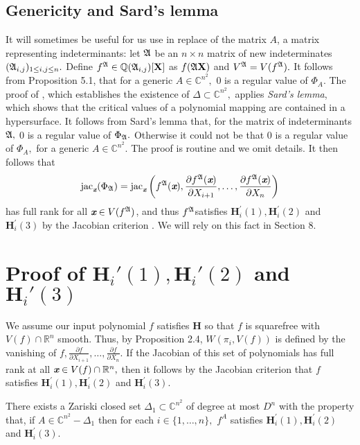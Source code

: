 \documentclass[sigconf]{acmart}
\def\xb{\textit{\textbf{x}}}
\def\C{\mathbb{C}}
\def\jac{ \textrm{jac}}
\def\pa{\partial}
\def\A{\frak{A}}
\begin{document}
\subsection{Genericity and Sard's lemma}
%
It will sometimes be useful for us use in replace of the matrix $A$, a matrix representing indeterminants: let $\A$ be an $n \times n$ matrix of new indeterminates $(\A_{i,j})_{1 \leq i , j \leq n}.$ Define $f^{\A} \in \mathbb{Q}(\A_{i,j})[\textbf{X}]$ as $f(\A\textbf{X})$ and $V^\A=V(f^\A).$ It follows from Proposition 5.1, that for a generic $A \in \C^{n^2},$ $0$ is a regular value of $\Phi_{A}$.  The proof of \cite[Theorem B.3]{TWT}, which establishes the existence of $\Delta \subset \C^{n^2},$ applies \textit{Sard's lemma}, which shows that the critical values of a polynomial mapping are contained in a hypersurface. It follows from Sard's lemma that, for the matrix of indeterminants $\A,$ $0$ is a regular value of $\Phi_{\A}.$ Otherwise it could not be that $0$ is a regular value of $\Phi_A,$ for a generic $A\in \C^{n^2}.$ The proof is routine and we omit details. It then follows that 
\[
\jac_{\xb}(\Phi_{\A}) = \jac_{\xb}\left(f^{\A}(\xb),\frac{\pa f^{\A}(\xb)}{\pa X_{i+1}},\hdots,\frac{\pa f^{\A}(\xb)}{\pa X_n}\right)
\]
has full rank for all $\xb \in V(f^{\A})$, and thus $f^{\A}$satisfies $\textbf{H}_i^{'}(1),\textbf{H}_i^{'}(2)$ and $\textbf{H}_i^{'}(3)$ by the Jacobian criterion \cite[Theorem 16.19]{ECA}. We will rely on this fact in Section 8.
%
\section{Proof of $\textbf{H}_i'(1),\textbf{H}_i'(2)$ and $\textbf{H}_i'(3)$}
%
We assume our input polynomial $f$ satisfies \textbf{H} so that $f$ is squarefree with $V(f) \cap \mathbb{R}^n$ smooth. Thus, by Proposition 2.4,  $W(\pi_i,V(f))$ is defined by the vanishing of $f,\frac{\pa f}{\pa X_{i+1}},\hdots,\frac{\pa f}{\pa X_n}.$ If the Jacobian of this set of polynomials has full rank at all $\xb \in V(f) \cap \mathbb{R}^n,$ then it follows by the Jacobian criterion \cite[Theorem 16.19]{ECA} that $f$ satisfies $\textbf{H}_i^{'}(1),\textbf{H}_i^{'}(2)$ and $\textbf{H}_i^{'}(3)$. 
%
\begin{theorem}
There exists a Zariski closed set $\Delta_1 \subset \C^{n^2}$ of degree at most $D^n$ with the property that, if $A \in \C^{n^2} - \Delta_1$ then for each $i \in \{1,\hdots,n\},$ $f^A$ satisfies $\textbf{H}_i^{'}(1),\textbf{H}_i^{'}(2)$ and $\textbf{H}_i^{'}(3)$.
\end{theorem}
%
\end{document}
